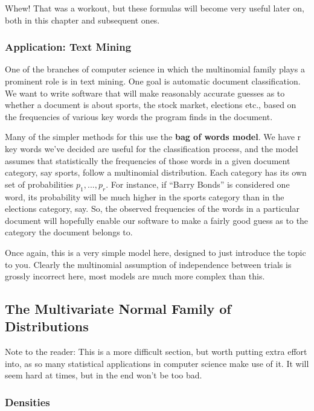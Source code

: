 Whew!  That was a workout, but these formulas will become very useful
later on, both in this chapter and subsequent ones. 

\subsubsection{Application:  Text Mining}
\label{textmining}

One of the branches of computer science in which the multinomial family
plays a prominent role is in text mining.  One goal is automatic
document classification.  We want to write software that will make
reasonably accurate guesses as to whether a document is about sports,
the stock market, elections etc., based on the frequencies of various
key words the program finds in the document.

Many of the simpler methods for this use the {\bf bag of words model}.
We have r key words we've decided are useful for the classification
process, and the model assumes that statistically the frequencies of
those words in a given document category, say sports, follow a
multinomial distribution.  Each category has its own set of
probabilities $p_1,...,p_r$.  For instance, if ``Barry Bonds'' is
considered one word, its probability will be much higher in the sports
category than in the elections category, say.  So,  the observed
frequencies of the words in a particular document will hopefully enable
our software to make a fairly good guess as to the category the document
belongs to.  

Once again, this is a very simple model here, designed to just introduce
the topic to you.  Clearly the multinomial assumption of independence
between trials is grossly incorrect here, most models are much more
complex than this.

\subsection{The Multivariate Normal Family of Distributions }
\label{multnormal}

Note to the reader:  This is a more difficult section, but worth putting
extra effort into, as so many statistical applications in computer
science make use of it.  It will seem hard at times, but in the end
won't be too bad.

\subsubsection{Densities}
\label{mvnormdens}

